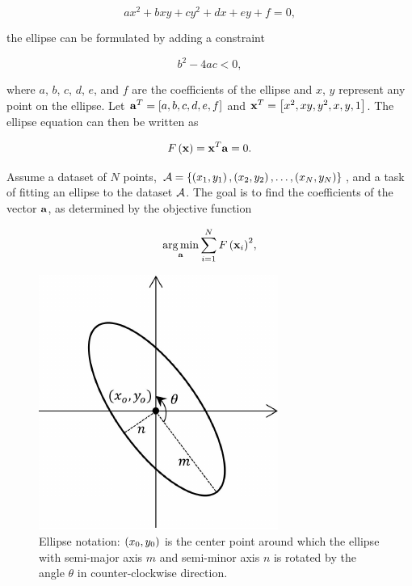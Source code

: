\begin{equation}
    ax^2 + bxy + cy^2 + dx + ey + f = 0,
\end{equation}

\noindent the ellipse can be formulated by adding a constraint

\begin{equation}
    b^2 - 4ac < 0,
\end{equation}

\noindent where $a$, $b$, $c$, $d$, $e$, and $f$ are the coefficients of the ellipse and $x$, $y$ represent any point on the ellipse. Let ${\mathbf{a}}^T = \left[ {a, b, c, d, e, f} \right]$ and ${\mathbf{x}}^T = \left[ {x^2, xy, y^2, x, y, 1} \right]$. The ellipse equation can then be written as

\begin{equation}
    {F} \left( \mathbf{x} \right) = \mathbf{x}^T\mathbf{a} = 0.
\end{equation}

\noindent Assume a dataset of $N$ points, $\mathcal{A} = \left\{ {\left( {x_1, y_1} \right), \left( {x_2, y_2} \right), \dots, \left( {x_N, y_N} \right)} \right\}$, and a task of fitting an ellipse to the dataset $\mathcal{A}$. The goal is to find the coefficients of the vector $\mathbf{a}$, as determined by the objective function

\begin{equation}
    \underset{\mathbf{a}}{\operatorname*{arg\,min}} \sum_{i = 1}^{N} {{F} \left( \mathbf{x}_i \right)}^2,
\end{equation}

\begin{figure}[t]
    \centerline{\includegraphics[width=0.4\linewidth]{figures/theoretical_foundations/fast_vot_rot_bbox_ellipse.pdf}}
    \caption[Ellipse notation]{Ellipse notation: $\left( {x_0, y_0} \right)$ is the center point around which the ellipse with semi-major axis $m$ and semi-minor axis $n$ is rotated by the angle $\theta$ in counter-clockwise direction. }
    \label{fig:FastVOTRotBBOXEllipse}
\end{figure}


